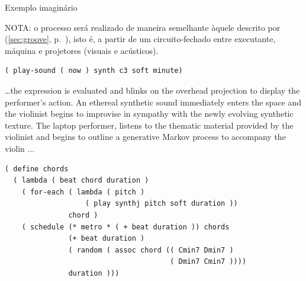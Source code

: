 \begin{example}{Exemplo imaginário}

NOTA: o processo será realizado de maneira semelhante àquele descrito por  (\autoref{sec:groove}, p.~\pageref{sec:groove}), isto é, a partir de um circuito-fechado entre executante, máquina e projetores (visuais e acústicos).

\begin{citacao}
\end{citacao}

\begin{verbatim}
( play-sound ( now ) synth c3 soft minute)
\end{verbatim}

\begin{citacao}
{
\ldots the expression is evaluated and blinks on the overhead projection to display the performer’s action. An ethereal synthetic sound immediately enters the space and the violinist begins to improvise in sympathy with the newly evolving synthetic texture. The laptop performer, listens to the thematic material provided by the violinist and begins to outline a generative Markov process to accompany the violin ...
}
\end{citacao}

\begin{verbatim}
( define chords
  ( lambda ( beat chord duration )
    ( for-each ( lambda ( pitch )
                   ( play synthj pitch soft duration ))
               chord )
    ( schedule (* metro * ( + beat duration )) chords
               (+ beat duration )
               ( random ( assoc chord (( Cmin7 Dmin7 )
                                       ( Dmin7 Cmin7 ))))
               duration )))


\end{verbatim}
\end{example}
